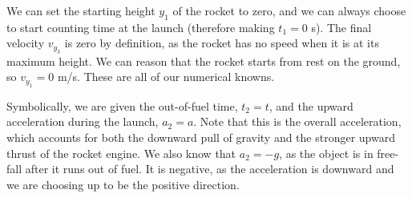 \documentclass[]{article}
\begin{document}
We can set the starting height $y_{1}$ of the rocket to zero, and we can always choose to start counting time at the launch (therefore making $t_{1}=0$ s). The final velocity $v_{y_{3}}$ is zero by definition, as the rocket has no speed when it is at its maximum height. We can reason that the rocket starts from rest on the ground, so $v_{y_{1}}=0$ m/s. These are all of our numerical knowns.

Symbolically, we are given the out-of-fuel time, $t_{2} = t$, and the upward acceleration during the launch, $a_{2}=a$. Note that this is the overall acceleration, which accounts for both the downward pull of gravity and the stronger upward thrust of the rocket engine. We also know that $a_{2}=-g$, as the object is in free-fall after it runs out of fuel. It is negative, as the acceleration is downward and we are choosing up to be the positive direction.
\end{document}

